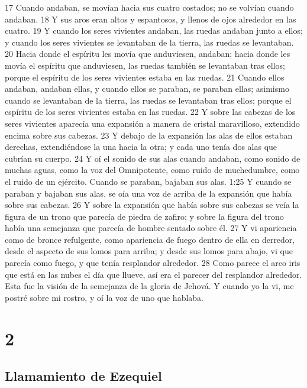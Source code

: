17 Cuando andaban, se movían hacia sus cuatro costados; no se volvían cuando andaban.
18 Y sus aros eran altos y espantosos, y llenos de ojos alrededor en las cuatro.
19 Y cuando los seres vivientes andaban, las ruedas andaban junto a ellos; y cuando los seres vivientes se levantaban de la tierra, las ruedas se levantaban.
20 Hacia donde el espíritu les movía que anduviesen, andaban; hacia donde les movía el espíritu que anduviesen, las ruedas también se levantaban tras ellos; porque el espíritu de los seres vivientes estaba en las ruedas.
21 Cuando ellos andaban, andaban ellas, y cuando ellos se paraban, se paraban ellas; asimismo cuando se levantaban de la tierra, las ruedas se levantaban tras ellos; porque el espíritu de los seres vivientes estaba en las ruedas. 
22 Y sobre las cabezas de los seres vivientes aparecía una expansión a manera de cristal maravilloso, extendido encima sobre sus cabezas.
23 Y debajo de la expansión las alas de ellos estaban derechas, extendiéndose la una hacia la otra; y cada uno tenía dos alas que cubrían su cuerpo.
24 Y oí el sonido de sus alas cuando andaban, como sonido de muchas aguas, como la voz del Omnipotente, como ruido de muchedumbre, como el ruido de un ejército. Cuando se paraban, bajaban sus alas.
1:25 Y cuando se paraban y bajaban sus alas, se oía una voz de arriba de la expansión que había sobre sus cabezas.
26 Y sobre la expansión que había sobre sus cabezas se veía la figura de un trono que parecía de piedra de zafiro; y sobre la figura del trono había una semejanza que parecía de hombre sentado sobre él. 
27 Y vi apariencia como de bronce refulgente, como apariencia de fuego dentro de ella en derredor, desde el aspecto de sus lomos para arriba; y desde sus lomos para abajo, vi que parecía como fuego, y que tenía resplandor alrededor.
28 Como parece el arco iris que está en las nubes el día que llueve, así era el parecer del resplandor alrededor. Esta fue la visión de la semejanza de la gloria de Jehová. Y cuando yo la vi, me postré sobre mi rostro, y oí la voz de uno que hablaba.

\chapter{2}

\section*{Llamamiento de Ezequiel}

